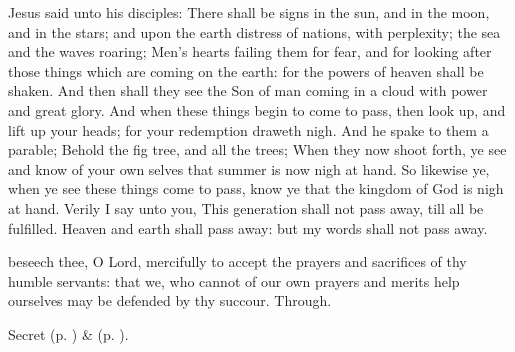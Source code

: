 
 Jesus said unto his disciples: There shall be signs in the sun, and in the moon, and in the stars; and upon the earth distress of nations, with perplexity; the sea and the waves roaring; Men's hearts failing them for fear, and for looking after those things which are coming on the earth: for the powers of heaven shall be shaken. And then shall they see the Son of man coming in a cloud with power and great glory. And when these things begin to come to pass, then look up, and lift up your heads; for your redemption draweth nigh. And he spake to them a parable; Behold the fig tree, and all the trees; When they now shoot forth, ye see and know of your own selves that summer is now nigh at hand. So likewise ye, when ye see these things come to pass, know ye that the kingdom of God is nigh at hand. Verily I say unto you, This generation shall not pass away, till all be fulfilled. Heaven and earth shall pass away: but my words shall not pass away.


\secret

\vspace{-0.05\baselineskip}

 beseech thee, O Lord, mercifully to accept the prayers and sacrifices of thy humble servants: that we, who cannot of our own prayers and merits help ourselves may be defended by thy succour. Through.

\begin{rubric}
     Secret  (p. \pageref{AdventISecret}) \&   (p. \pageref{SPMaryInAdvent}).
\end{rubric}


\vspace{-0.25\baselineskip}

\postcommunion

